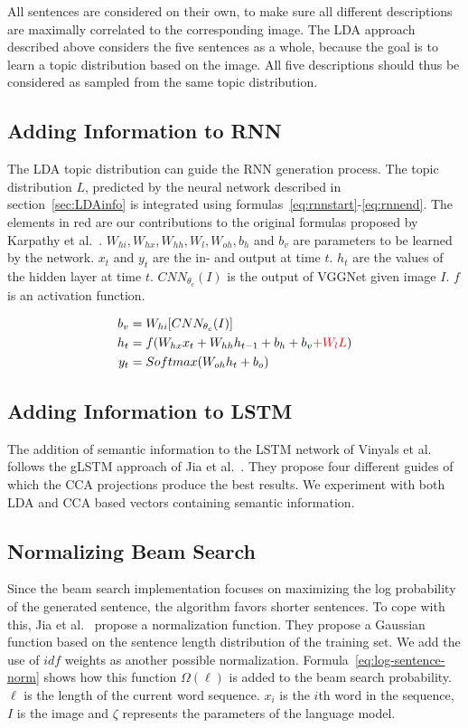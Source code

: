 \documentclass[twoside,twocolumn]{article}
\begin{document}
	All sentences are considered on their own, to make sure all different descriptions are maximally correlated to the corresponding image. The LDA approach described above considers the five sentences as a whole, because the goal is to learn a topic distribution based on the image. All five descriptions should thus be considered as sampled from the same topic distribution.
	
	
	\subsection{Adding Information to RNN}
	The LDA topic distribution can guide the RNN generation process. The topic distribution $L$, predicted by the neural network described in section~\ref{sec:LDAinfo} is integrated using formulas~\eqref{eq:rnnstart}-\eqref{eq:rnnend}. The elements in red are our contributions to the original formulas proposed by Karpathy et al.~\cite{Karpathy2015}. $W_{hi}, W_{hx}, W_{hh}, W_l, W_{oh}, b_h$ and $b_v$ are parameters to be learned by the network. $x_t$ and $y_t$ are the in- and output at time $t$. $h_t$ are the values of the hidden layer at time $t$. $CNN_{\theta_c}(I)$ is the output of VGGNet given image $I$. $f$ is an activation function.
	
	\begin{align}
	\vspace{-3mm}
	\label{eq:rnnstart}
	b_v&=W_{hi} [CNN_{\theta_c}(I)] \\
	\label{eq:rnn}
	h_t&=f(W_{hx} x_{t} + W_{hh} h_{t-1} + b_h + b_v \color{red}{+W_lL}\color{black}) \\
	y_t&=Softmax( W_{oh} h_t + b_o)
	\label{eq:rnnend}
	\end{align}
	
	
	
	\subsection{Adding Information to LSTM}
	The addition of semantic information to the LSTM network of Vinyals et al.~\cite{Google} follows the gLSTM approach of Jia et al.~\cite{Fernando2015}. They propose four different guides of which the CCA projections produce the best results. We experiment with both LDA and CCA based vectors containing semantic information.
	
	\subsection{Normalizing Beam Search}
	Since the beam search implementation focuses on maximizing the log probability of the generated sentence, the algorithm favors shorter sentences. To cope with this, Jia et al.~\cite{Fernando2015} propose a normalization function. They propose a Gaussian function based on the sentence length distribution of the training set. We add the use of $idf$ weights as another possible normalization. Formula~\eqref{eq:log-sentence-norm} shows how this function $\Omega(\ell)$ is added to the beam search probability. $\ell$ is the length of the current word sequence. $x_i$ is the $i$th word in the sequence, $I$ is the image and $\zeta$ represents the parameters of the language model. 
	
\end{document}
